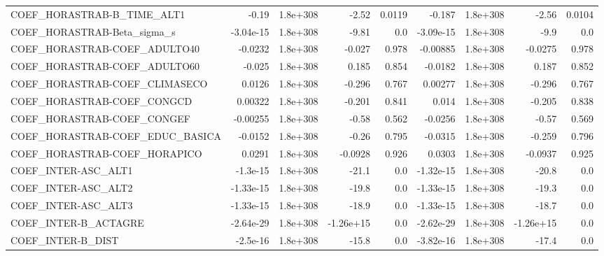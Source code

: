 \begin{tabular}{lrrrrrrrr}
COEF\_HORASTRAB-B\_TIME\_ALT1        &       -0.19 &     1.8e+308 &     -2.52 &   0.0119 &     -0.187 &    1.8e+308 &        -2.56 &        0.0104 \\
COEF\_HORASTRAB-Beta\_sigma\_s       &   -3.04e-15 &     1.8e+308 &     -9.81 &      0.0 &  -3.09e-15 &    1.8e+308 &         -9.9 &           0.0 \\
COEF\_HORASTRAB-COEF\_ADULTO40      &     -0.0232 &     1.8e+308 &    -0.027 &    0.978 &   -0.00885 &    1.8e+308 &      -0.0275 &         0.978 \\
COEF\_HORASTRAB-COEF\_ADULTO60      &      -0.025 &     1.8e+308 &     0.185 &    0.854 &    -0.0182 &    1.8e+308 &        0.187 &         0.852 \\
COEF\_HORASTRAB-COEF\_CLIMASECO     &      0.0126 &     1.8e+308 &    -0.296 &    0.767 &    0.00277 &    1.8e+308 &       -0.296 &         0.767 \\
COEF\_HORASTRAB-COEF\_CONGCD        &     0.00322 &     1.8e+308 &    -0.201 &    0.841 &      0.014 &    1.8e+308 &       -0.205 &         0.838 \\
COEF\_HORASTRAB-COEF\_CONGEF        &    -0.00255 &     1.8e+308 &     -0.58 &    0.562 &    -0.0256 &    1.8e+308 &        -0.57 &         0.569 \\
COEF\_HORASTRAB-COEF\_EDUC\_BASICA   &     -0.0152 &     1.8e+308 &     -0.26 &    0.795 &    -0.0315 &    1.8e+308 &       -0.259 &         0.796 \\
COEF\_HORASTRAB-COEF\_HORAPICO      &      0.0291 &     1.8e+308 &   -0.0928 &    0.926 &     0.0303 &    1.8e+308 &      -0.0937 &         0.925 \\
COEF\_INTER-ASC\_ALT1               &    -1.3e-15 &     1.8e+308 &     -21.1 &      0.0 &  -1.32e-15 &    1.8e+308 &        -20.8 &           0.0 \\
COEF\_INTER-ASC\_ALT2               &   -1.33e-15 &     1.8e+308 &     -19.8 &      0.0 &  -1.33e-15 &    1.8e+308 &        -19.3 &           0.0 \\
COEF\_INTER-ASC\_ALT3               &   -1.33e-15 &     1.8e+308 &     -18.9 &      0.0 &  -1.33e-15 &    1.8e+308 &        -18.7 &           0.0 \\
COEF\_INTER-B\_ACTAGRE              &   -2.64e-29 &     1.8e+308 & -1.26e+15 &      0.0 &  -2.62e-29 &    1.8e+308 &    -1.26e+15 &           0.0 \\
COEF\_INTER-B\_DIST                 &    -2.5e-16 &     1.8e+308 &     -15.8 &      0.0 &  -3.82e-16 &    1.8e+308 &        -17.4 &           0.0 \\

\end{tabular}
